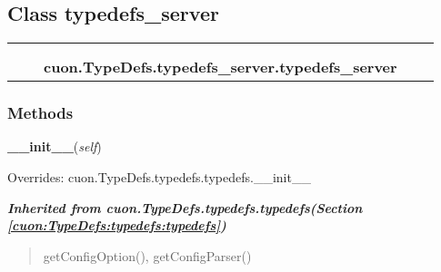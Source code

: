 \subsection{Class typedefs\_server}

    \label{cuon:TypeDefs:typedefs_server:typedefs_server}
\begin{tabular}{cccccc}
\multicolumn{2}{r}{\settowidth{\BCL}{cuon.TypeDefs.typedefs.typedefs}\multirow{2}{\BCL}{cuon.TypeDefs.typedefs.typedefs}}
&&
  \\\cline{3-3}
  &&\multicolumn{1}{c|}{}
&&
  \\
&&\multicolumn{2}{l}{\textbf{cuon.TypeDefs.typedefs\_server.typedefs\_server}}
\end{tabular}



  \subsubsection{Methods}

    \vspace{0.5ex}

\hspace{.8\funcindent}\begin{boxedminipage}{\funcwidth}

    \raggedright \textbf{\_\_init\_\_}(\textit{self})

\setlength{\parskip}{2ex}
\setlength{\parskip}{1ex}
      Overrides: cuon.TypeDefs.typedefs.typedefs.\_\_init\_\_

    \end{boxedminipage}


\large{\textbf{\textit{Inherited from cuon.TypeDefs.typedefs.typedefs\textit{(Section \ref{cuon:TypeDefs:typedefs:typedefs})}}}}

\begin{quote}
getConfigOption(), getConfigParser()
\end{quote}
